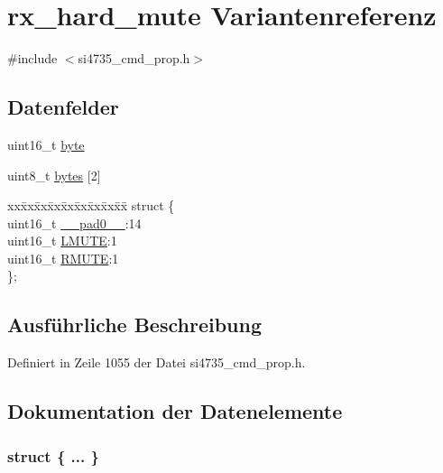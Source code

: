 \hypertarget{unionrx__hard__mute}{}\section{rx\+\_\+hard\+\_\+mute Variantenreferenz}
\label{unionrx__hard__mute}


{\ttfamily \#include $<$si4735\+\_\+cmd\+\_\+prop.\+h$>$}

\subsection*{Datenfelder}
\begin{DoxyCompactItemize}
\item 
uint16\+\_\+t \hyperlink{unionrx__hard__mute_ab0549c1b5ea980a02e7eab77e21fea49}{byte}
\item 
uint8\+\_\+t \hyperlink{unionrx__hard__mute_a46e4c05d20a047ec169f60d3167e912e}{bytes} \mbox{[}2\mbox{]}
\item 
\begin{tabbing}
xx\=xx\=xx\=xx\=xx\=xx\=xx\=xx\=xx\=\kill
struct \{\\
\>uint16\_t \hyperlink{unionrx__hard__mute_a77132c2c26a75f5b8751b235cda23828}{\_\_pad0\_\_}:14\\
\>uint16\_t \hyperlink{unionrx__hard__mute_af01ca9e8c674119ab743ec7a084a56b3}{LMUTE}:1\\
\>uint16\_t \hyperlink{unionrx__hard__mute_a21b48010c5f26c6dc60ad46364bc10a0}{RMUTE}:1\\
\}; \\

\end{tabbing}\end{DoxyCompactItemize}


\subsection{Ausführliche Beschreibung}


Definiert in Zeile 1055 der Datei si4735\+\_\+cmd\+\_\+prop.\+h.



\subsection{Dokumentation der Datenelemente}
\hypertarget{unionrx__hard__mute_a40d7ad45a15f7efc8dbda66dff220270}{}\subsubsection[{"@129}]{\setlength{\rightskip}{0pt plus 5cm}struct \{ ... \} }\label{unionrx__hard__mute_a40d7ad45a15f7efc8dbda66dff220270}
\hypertarget{unionrx__hard__mute_a77132c2c26a75f5b8751b235cda23828}{}
